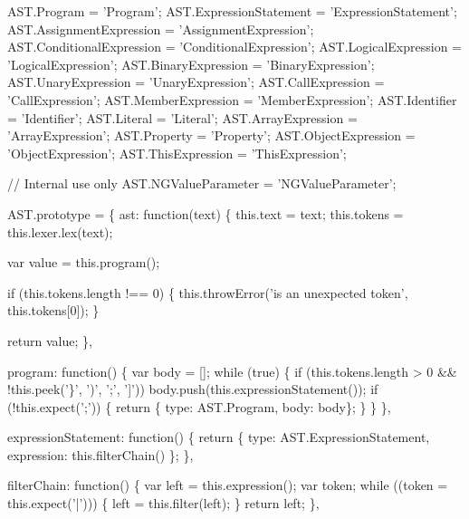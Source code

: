 \begin{DoxyCodeInclude}
{{AST.Program = \textcolor{stringliteral}{'Program'};
AST.ExpressionStatement = \textcolor{stringliteral}{'ExpressionStatement'};
AST.AssignmentExpression = \textcolor{stringliteral}{'AssignmentExpression'};
AST.ConditionalExpression = \textcolor{stringliteral}{'ConditionalExpression'};
AST.LogicalExpression = \textcolor{stringliteral}{'LogicalExpression'};
AST.BinaryExpression = \textcolor{stringliteral}{'BinaryExpression'};
AST.UnaryExpression = \textcolor{stringliteral}{'UnaryExpression'};
AST.CallExpression = \textcolor{stringliteral}{'CallExpression'};
AST.MemberExpression = \textcolor{stringliteral}{'MemberExpression'};
AST.Identifier = \textcolor{stringliteral}{'Identifier'};
AST.Literal = \textcolor{stringliteral}{'Literal'};
AST.ArrayExpression = \textcolor{stringliteral}{'ArrayExpression'};
AST.Property = \textcolor{stringliteral}{'Property'};
AST.ObjectExpression = \textcolor{stringliteral}{'ObjectExpression'};
AST.ThisExpression = \textcolor{stringliteral}{'ThisExpression'};

\textcolor{comment}{// Internal use only}
AST.NGValueParameter = \textcolor{stringliteral}{'NGValueParameter'};

AST.prototype = \{
  ast: \textcolor{keyword}{function}(text) \{
    this.text = text;
    this.tokens = this.lexer.lex(text);

    var value = this.program();

    \textcolor{keywordflow}{if} (this.tokens.length !== 0) \{
      this.throwError(\textcolor{stringliteral}{'is an unexpected token'}, this.tokens[0]);
    \}

    \textcolor{keywordflow}{return} value;
  \},

  program: \textcolor{keyword}{function}() \{
    var body = [];
    \textcolor{keywordflow}{while} (\textcolor{keyword}{true}) \{
      \textcolor{keywordflow}{if} (this.tokens.length > 0 && !\textcolor{keyword}{this}.peek(\textcolor{charliteral}{'\}'}, \textcolor{charliteral}{')'}, \textcolor{charliteral}{';'}, \textcolor{charliteral}{']'}))
        body.push(\textcolor{keyword}{this}.expressionStatement());
      \textcolor{keywordflow}{if} (!this.expect(\textcolor{charliteral}{';'})) \{
        \textcolor{keywordflow}{return} \{ type: AST.Program, body: body\};
      \}
    \}
  \},

  expressionStatement: \textcolor{keyword}{function}() \{
    \textcolor{keywordflow}{return} \{ type: AST.ExpressionStatement, expression: this.filterChain() \};
  \},

  filterChain: \textcolor{keyword}{function}() \{
    var left = this.expression();
    var token;
    \textcolor{keywordflow}{while} ((token = this.expect(\textcolor{charliteral}{'|'}))) \{
      left = this.filter(left);
    \}
    \textcolor{keywordflow}{return} left;
  \},

}}
\end{DoxyCodeInclude}

